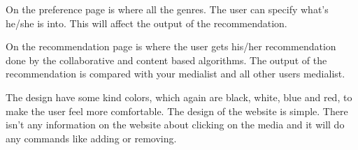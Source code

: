 On the preference page is where all the genres. The user can specify what’s he/she is into. This will affect the output of the recommendation.

On the recommendation page is where the user gets his/her recommendation done by the collaborative and content based algorithms. The output of the recommendation is compared with your medialist and all other users medialist.

The design have some kind colors, which again are black, white, blue and red, to make the user feel more comfortable. The design of the website is simple. There isn't any information on the website about clicking on the media and it will do any commands like adding or removing.
